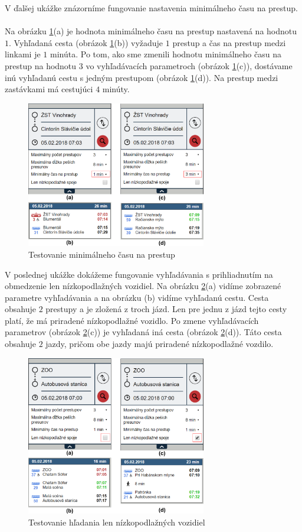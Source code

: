 V ďalšej ukážke znázorníme fungovanie nastavenia minimálneho času na prestup. 
\\ \\
Na obrázku \ref{fig:test-min-transfer}(a) je hodnota minimálneho času na prestup nastavená na hodnotu $1$. Vyhľadaná cesta (obrázok \ref{fig:test-min-transfer}(b)) vyžaduje $1$ prestup a čas na prestup medzi linkami je $1$ minúta. Po tom, ako sme zmenili hodnotu minimálneho času na prestup na hodnotu $3$ vo vyhľadávacích parametroch (obrázok \ref{fig:test-min-transfer}(c)), dostávame inú vyhľadanú cestu s jedným prestupom (obrázok \ref{fig:test-min-transfer}(d)). Na prestup medzi zastávkami má cestujúci $4$ minúty.

\begin{figure}[H]
\centerline{\includegraphics[width=0.7\textwidth]{images/test/min-transfer}}
\caption[Testovanie minimálneho času na prestup]{Testovanie minimálneho času na prestup}
\label{fig:test-min-transfer}
\end{figure}

V poslednej ukážke dokážeme fungovanie vyhľadávania s prihliadnutím na obmedzenie len nízkopodlažných vozidiel. Na obrázku \ref{fig:test-low-floor}(a) vidíme zobrazené parametre vyhľadávania a na obrázku (b) vidíme vyhľadanú cestu. Cesta obsahuje $2$ prestupy a je zložená z troch jázd. Len pre jednu z jázd tejto cesty platí, že má priradené nízkopodlažné vozidlo. Po zmene vyhľadávacích parametrov (obrázok \ref{fig:test-low-floor}(c)) je vyhľadaná iná cesta (obrázok \ref{fig:test-low-floor}(d)). Táto cesta obsahuje $2$ jazdy, pričom obe jazdy majú priradené nízkopodlažné vozdilo.

\begin{figure}[H]
\centerline{\includegraphics[width=0.7\textwidth]{images/test/low-floor}}
\caption[Testovanie hľadania len nízkopodlažných vozidiel]{Testovanie hľadania len nízkopodlažných vozidiel}
\label{fig:test-low-floor}
\end{figure}





